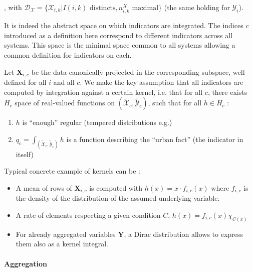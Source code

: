 \documentclass[runningheads,a4paper]{llncs2e/llncs}
\begin{document}
, with $\mathcal{D}_{\mathcal{X}}=\{\mathcal{X}_{i,k}|I(i,k)\textrm{ distincts},n_{i,k}^{X}\mbox{ maximal}\}$
(the same holding for $\mathcal{Y}_{i}$).

It is indeed the abstract space on which indicators are integrated. The indices $c$ introduced as a definition here correspond to different indicators across all systems. This space is the minimal space common to all systems allowing a common definition for indicators on each.


Let $\mathbf{X}_{i,c}$ be the data canonically projected in the corresponding subspace, well defined for all $i$ and all $c$. We make the key assumption that all indicators are computed by integration against a certain kernel, i.e. that for all $c$, there exists $H_{c}$ space of real-valued functions on $(\tilde{\mathcal{X}}_{c},\tilde{\mathcal{Y}}_{c})$, such that for all $h\in H_{c}$ :
\begin{enumerate}
\item $h$ is ``enough'' regular (tempered distributions e.g.)
\item $q_c=\int_{(\tilde{\mathcal{X}}_{c},\tilde{\mathcal{Y}}_{c})}h$ is a function describing the ``urban fact'' (the indicator in itself)
\end{enumerate}

Typical concrete example of kernels can be :

\begin{itemize}
\item A mean of rows of $\mathbf{X}_{i,c}$ is computed with $h(x)=x\cdot f_{i,c}(x)$ where $f_{i,c}$ is the density of the distribution of the assumed underlying variable.
\item A rate of elements respecting a given condition $C$, $h(x)=f_{i,c}(x)\chi_{C(x)}$ 
\item For already aggregated variables $\mathbf{Y}$, a Dirac distribution allows to express them also as a kernel integral. 
\end{itemize}


\paragraph{Aggregation}
\end{document}
